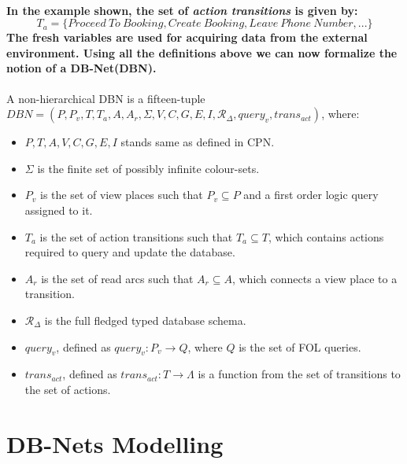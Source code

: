 \paragraph*{\textnormal{In the example shown, the set of \textit{action transitions} is given by:
\begin{equation*}
T_{a} = \{Proceed\ To\ Booking, Create\ Booking, Leave\ Phone\ Number, ...\}
\end{equation*}
The fresh variables are used for acquiring data from the external environment. Using all the definitions above we can now formalize the notion of a DB-Net(DBN).}}
\begin{defs}
	\label{defs:DBN_formal_definition_DBN}
	A non-hierarchical DBN is a fifteen-tuple\\{$\mathit{DBN = (P,P_{v},T,T_{a},A,A_{r},\Sigma,V,C,G,E,I,\mathcal{R}_{\Delta},query_{v},trans_{act})}$}, where:
	\begin{itemize}
		\item $\mathit{P,T,A,V,C,G,E,I}$ stands same as defined in CPN.
		\item $\mathit{\Sigma}$ is the finite set of possibly infinite colour-sets.
		\item $\mathit{P_{v}}$ is the set of view places such that $\mathit{P_{v} \subseteq P}$ and a first order logic query assigned to it.
		\item $\mathit{T_{a}}$ is the set of action transitions such that $\mathit{T_{a} \subseteq T}$, which contains actions required to query and update the database.
		\item $\mathit{A_{r}}$ is the set of read arcs such that $\mathit{A_{r} \subseteq A}$, which connects a view place to a transition.
		\item $\mathit{\mathcal{R}_{\Delta}}$ is the full fledged typed database schema.
		\item $\mathit{query_{v}}$, defined as $\mathit{query_{v} : P_{v} \rightarrow Q}$, where $\mathit{Q}$ is the set of FOL queries.
		\item $\mathit{trans_{act}}$, defined as $\mathit{trans_{act}: T \rightarrow \Lambda}$ is a function from the set of transitions to the set of actions.
	\end{itemize}
\end{defs}

\section{DB-Nets Modelling}
